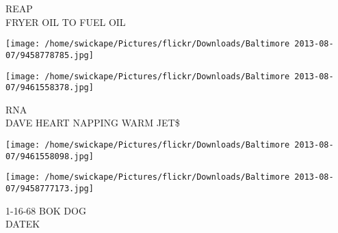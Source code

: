 \documentclass[10pt,letterpaper]{article}
\begin{document}
REAP\\
FRYER OIL TO FUEL OIL
\pagebreak

\texttt{[image: /home/swickape/Pictures/flickr/Downloads/Baltimore 2013-08-07/9458778785.jpg]}

\vspace{0.25in}
\texttt{[image: /home/swickape/Pictures/flickr/Downloads/Baltimore 2013-08-07/9461558378.jpg]}

RNA\\
DAVE HEART NAPPING WARM JET\$
\pagebreak

\texttt{[image: /home/swickape/Pictures/flickr/Downloads/Baltimore 2013-08-07/9461558098.jpg]}

\vspace{0.25in}
\texttt{[image: /home/swickape/Pictures/flickr/Downloads/Baltimore 2013-08-07/9458777173.jpg]}

1{-}16{-}68 BOK DOG\\
DATEK
\pagebreak
\end{document}
